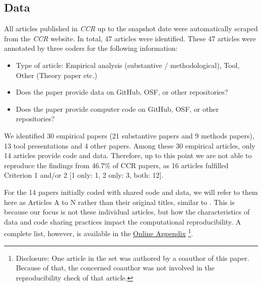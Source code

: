 \subsection{Data}%


All articles published in \textit{CCR} up to the snapshot date were automatically scraped from the \textit{CCR} website. In total, 47 articles were identified.
These 47 articles were annotated by three coders for the following information:

\begin{itemize}
  \item Type of article: Empirical analysis (substantive / methodological), Tool, Other (Theory paper etc.)
  \item Does the paper provide data on GitHub, OSF, or other repositories?
  \item Does the paper provide computer code on GitHub, OSF, or other repositories?
\end{itemize}

We identified 30 empirical papers (21 substantive papers and 9 methods papers), 13 tool presentations and 4 other papers. Among these 30 empirical articles, only 14 articles provide code and data. Therefore, up to this point we are not able to reproduce the findings from 46.7\% of CCR papers, as 16 articles fulfilled Criterion 1 and/or 2 [1 only: 1, 2 only: 3, both: 12].

For the 14 papers initially coded with shared code and data, we will refer to them here as Articles A to N rather than their original titles, similar to \textcite[]{cruewell:2023:WB}. This is because our focus is not these individual articles, but how the characteristics of data and code sharing practices impact the computational reproducibility. A complete list, however, is available in the \href{https://anonymous.4open.science/r/what_makes_computational_communication_science_irreproducible}{Online Appendix} %
\footnote{Disclosure: One article in the set %
was authored by a coauthor of this paper. Because of that, the concerned coauthor was not involved in the reproducibility check of that article.}.

